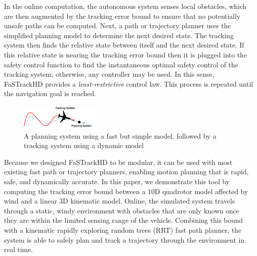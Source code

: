 In the online computation, the autonomous system senses local obstacles, which are then augmented by the tracking error bound to ensure that no potentially unsafe paths can be computed. Next, a path or trajectory planner uses the simplified planning model to determine the next desired state. The tracking system then finds the relative state between itself and the next desired state. If this relative state is nearing the tracking error bound then it is plugged into the safety control function to find the instantaneous optimal safety control of the tracking system; otherwise, any controller may be used. In this sense, FaSTrackHD provides a \emph{least-restrictive} control law. This process is repeated until the navigation goal is reached. 
  

\begin{figure}
	\centering
	\includegraphics[width=0.35\textwidth]{fig/chasing}
	\caption{A planning system using a fast but simple model, followed by a tracking system using a dynamic model}
	\label{fig:chasing}
	\vspace{-.23in}
\end{figure}
%
Because we designed FaSTrackHD to be modular, it can be used with most existing fast path or trajectory planners, enabling motion planning that is rapid, safe, and dynamically accurate. In this paper, we demonstrate this tool by computing the tracking error bound between a 10D quadrotor model affected by wind and a linear 3D kinematic model. Online, the simulated system travels through a static, windy environment with obstacles that are only known once they are within the limited sensing range of the vehicle. Combining this bound with a kinematic rapidly exploring random trees (RRT) fast path planner, the system is able to safely plan and track a trajectory through the environment in real time.